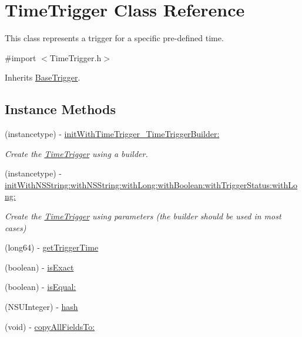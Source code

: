 \hypertarget{interface_time_trigger}{}\section{Time\+Trigger Class Reference}
\label{interface_time_trigger}


This class represents a trigger for a specific pre-\/defined time.  




{\ttfamily \#import $<$Time\+Trigger.\+h$>$}



Inherits \hyperlink{interface_base_trigger}{Base\+Trigger}.

\subsection*{Instance Methods}
\begin{DoxyCompactItemize}
\item 
(instancetype) -\/ \hyperlink{interface_time_trigger_af005b9d04bd864735826261c461437a3}{init\+With\+Time\+Trigger\+\_\+\+Time\+Trigger\+Builder\+:}
\begin{DoxyCompactList}\small\item\em Create the \hyperlink{interface_time_trigger}{Time\+Trigger} using a builder. \end{DoxyCompactList}\item 
(instancetype) -\/ \hyperlink{interface_time_trigger_afa1cdd1fb8a5b1ecf5e782f144d7986b}{init\+With\+N\+S\+String\+:with\+N\+S\+String\+:with\+Long\+:with\+Boolean\+:with\+Trigger\+Status\+:with\+Long\+:}
\begin{DoxyCompactList}\small\item\em Create the \hyperlink{interface_time_trigger}{Time\+Trigger} using parameters (the builder should be used in most cases) \end{DoxyCompactList}\item 
(long64) -\/ \hyperlink{interface_time_trigger_a73c0307b46dd3eb20bc84f2bf6018102}{get\+Trigger\+Time}
\item 
(boolean) -\/ \hyperlink{interface_time_trigger_ac9636f9b2335150f439ad88e25c1598a}{is\+Exact}
\item 
(boolean) -\/ \hyperlink{interface_time_trigger_ab6218fe051293376112d189468448969}{is\+Equal\+:}
\item 
(N\+S\+U\+Integer) -\/ \hyperlink{interface_time_trigger_af668a77745cec1603cda53b1cbaf9a1c}{hash}
\item 
(void) -\/ \hyperlink{interface_time_trigger_ab5d9a0f6ff49b9d557865bdb75b27231}{copy\+All\+Fields\+To\+:}
\end{DoxyCompactItemize}
